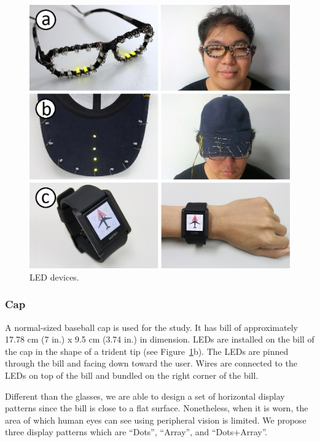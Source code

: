 \documentclass{sigchi}
\begin{document}
\begin{figure}[!b]
\centering
\includegraphics[width=\columnwidth]{prototype_visual3}
\caption{LED devices.}
\label{fig:visual_devices}
\end{figure}


\subsubsection{Cap}
A normal-sized baseball cap is used for the study. It has bill of approximately 17.78 cm (7 in.) x 9.5 cm (3.74 in.) in dimension. LEDs are installed on the bill of the cap in the shape of a trident tip (see Figure~\ref{fig:visual_devices}b). The LEDs are pinned through the bill and facing down toward the user. Wires are connected to the LEDs on top of the bill and bundled on the right corner of the bill.

Different than the glasses, we are able to design a set of horizontal display patterns since the bill is close to a flat surface. Nonetheless, when it is worn, the area of which human eyes can see using peripheral vision is limited. We propose three display patterns which are \textquotedblleft Dots\textquotedblright, \textquotedblleft Array\textquotedblright, and \textquotedblleft Dots+Array\textquotedblright.
\end{document}
